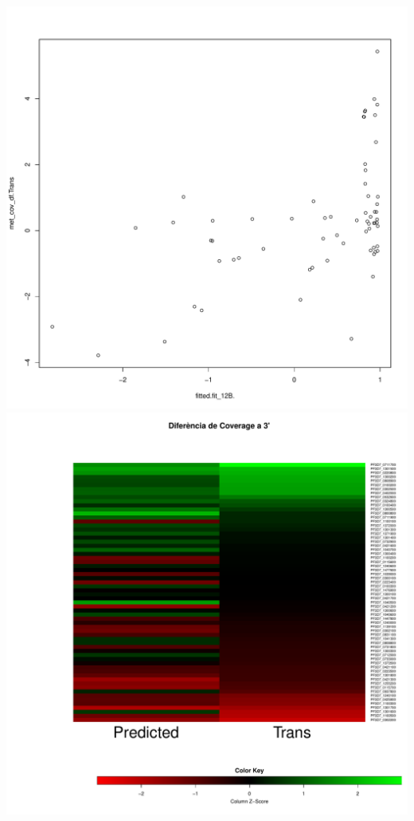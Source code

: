 \documentclass{article}\usepackage[]{graphicx}\usepackage[]{color}
\newenvironment{knitrout}{}{} %
\begin{document}
\begin{knitrout}
{\includegraphics[width=.9\linewidth]{figure/minimal-heat_fitted_model-3} 
\includegraphics[width=.9\linewidth]{figure/minimal-heat_fitted_model-4} 

}



\end{knitrout}
\end{document}
